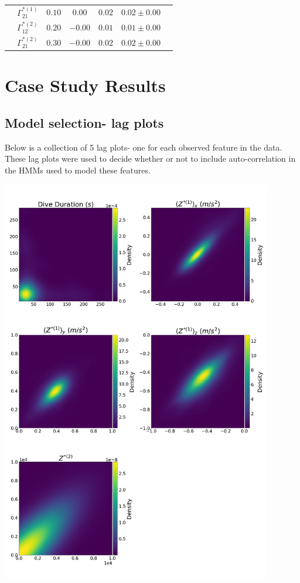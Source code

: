 \documentclass[12pt]{TD-CJS}
\begin{document}
{\begin{tabular}{ccccccc}
                             & $\Gamma^{*(1)}_{21}$          & $0.10$                         & $0.00$                   & $0.02$                           & $0.02 \pm 0.00$                             \\
                             & $\Gamma^{*(2)}_{12}$          & $0.20$                         & $-0.00$                   & $0.01$                           & $0.01 \pm 0.00$                             \\
                             & $\Gamma^{*(2)}_{21}$          & $0.30$                         & $-0.00$                   & $0.02$                           & $0.02 \pm 0.00$                             \\ \hline

\end{tabular}
}

\newpage
\section{Case Study Results}
\subsection{Model selection- lag plots}

Below is a collection of 5 lag plots- one for each observed feature in the data. These lag plots were used to decide whether or not to include auto-correlation in the HMMs used to model these features.

\includegraphics[height=7in]{../Plots/lagplot.png}
\end{document}
